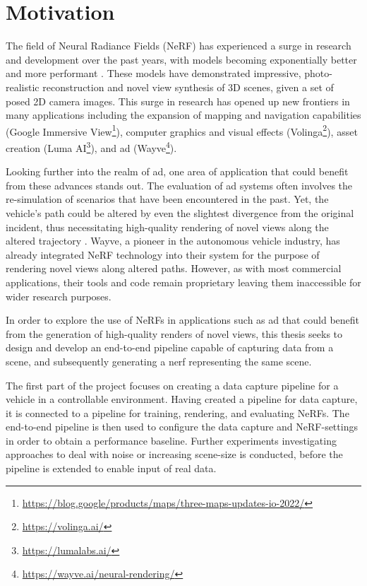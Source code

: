 \section{Motivation}
The field of Neural Radiance Fields (NeRF) has experienced a surge in research and development over the past years, with models becoming exponentially better and more performant \cite{debbagh_neural_2023}. These models have demonstrated impressive, photo-realistic reconstruction and novel view synthesis of 3D scenes, given a set of posed 2D camera images. This surge in research has opened up new frontiers in many applications including the expansion of mapping and navigation capabilities (Google Immersive View\footnote{\url{https://blog.google/products/maps/three-maps-updates-io-2022/}}), computer graphics and visual effects (Volinga\footnote{\url{https://volinga.ai/}}), asset creation (Luma AI\footnote{\url{https://lumalabs.ai/}}), and \acrshort{ad} (Wayve\footnote{\url{https://wayve.ai/neural-rendering/}}). 

Looking further into the realm of \acrshort{ad}, one area of application that could benefit from these advances stands out. The evaluation of \acrshort{ad} systems often involves the re-simulation of scenarios that have been encountered in the past. Yet, the vehicle's path could be altered by even the slightest divergence from the original incident, thus necessitating high-quality rendering of novel views along the altered trajectory \cite{tancik_block-nerf_2022}. Wayve, a pioneer in the autonomous vehicle industry, has already integrated NeRF technology into their system for the purpose of rendering novel views along altered paths. However, as with most commercial applications, their tools and code remain proprietary leaving them inaccessible for wider research purposes.

In order to explore the use of NeRFs in applications such as \acrshort{ad} that could benefit from the generation of high-quality renders of novel views, this thesis seeks to design and develop an end-to-end pipeline capable of capturing data from a scene, and subsequently generating a \acrshort{nerf} representing the same scene. 

The first part of the project focuses on creating a data capture pipeline for a vehicle in a controllable environment. Having created a pipeline for data capture, it is connected to a pipeline for training, rendering, and evaluating NeRFs. The end-to-end pipeline is then used to configure the data capture and NeRF-settings in order to obtain a performance baseline. Further experiments investigating approaches to deal with noise or increasing scene-size is conducted, before the pipeline is extended to enable input of real data.

